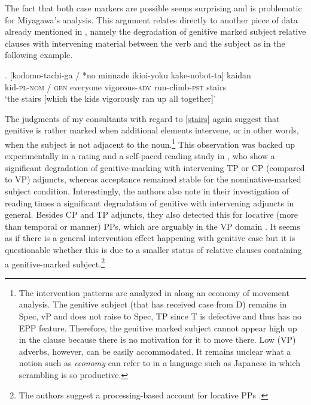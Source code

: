\documentclass [output=book,colorlinks,citecolor=brown]{langscibook}
\begin{document}
The fact that both case markers are possible seems surprising and is problematic for Miyagawa's analysis. This argument relates directly to another piece of data already mentioned in \citet{harada:1971:ga}, namely the degradation of genitive marked subject relative clauses with intervening material between the verb and the subject as in the following example. %

\exg. [kodomo-tachi-ga / *no minnade ikioi-yoku kake-nobot-ta] kaidan\\
kid-\textsc{pl}-\textsc{nom} / \textsc{gen} everyone vigorous-\textsc{adv} run-climb-\textsc{pst} stairs\\
`the stairs [which the kids vigorously ran up all together]’ \\ \null \hfill \citep[30]{harada:1971:ga} \label{stairs}

The judgments of my consultants with regard to \ref{stairs} again suggest that genitive is rather marked when additional elements intervene, or in other words, when the subject is not adjacent to the noun.\footnote{The intervention patterns are analyzed in \citet[sec. 4.2.]{miyagawa:2011:genitive} along an economy of movement analysis. The genitive subject (that has received case from D) remains in Spec, vP and does not raise to Spec, TP since T is defective and thus has no EPP feature. Therefore, the genitive marked subject cannot appear high up in the clause because there is no motivation for it to move there. Low (VP) adverbs, however, can be easily accommodated. It remains unclear what a notion such as \textit{economy} can refer to in a language such as Japanese in which scrambling is so productive.} This observation was backed up experimentally in a rating and a self-paced reading study in \citet{nambu:2014:an, nambu:2023:experimental}, who show a significant degradation of genitive-marking with intervening TP or CP (compared to VP) adjuncts, whereas acceptance remained stable for the nominative-marked subject condition. Interestingly, the authors also note in their investigation of reading times a significant degradation of genitive with intervening adjuncts in general. Besides CP and TP adjuncts, they also detected this for locative (more than temporal or manner) PPs, which are arguably in the VP domain \citep[15–23]{nambu:2023:experimental}. It seems as if there is a general intervention effect happening with genitive case but it is questionable whether this is due to a smaller status of relative clauses containing a genitive-marked subject.\footnote{The authors suggest a processing-based account for locative PPs \citep[25]{nambu:2023:experimental}.} %
\end{document}
